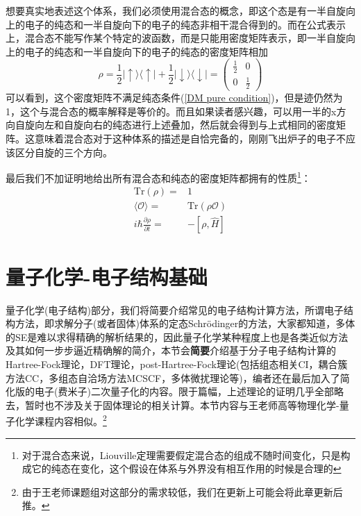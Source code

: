 \documentclass[12pt,a4paper,openany,twoside]{book}
\numberwithin{equation}{section}
\begin{document}
  想要真实地表述这个体系，我们必须使用混合态的概念，即这个态是有一半自旋向上的电子的纯态和一半自旋向下的电子的纯态非相干混合得到的。而在公式表示上，混合态不能写作某个特定的波函数，而是只能用密度矩阵表示，即一半自旋向上的电子的纯态和一半自旋向下的电子的纯态的密度矩阵相加
  \begin{equation}
    \rho = \frac{1}{2} | \uparrow \rangle \langle \uparrow |+\frac{1}{2} | \downarrow \rangle \langle \downarrow |=\left(\begin{array}{ll} {\frac{1}{2}}&{0}\\{0}&{\frac{1}{2}} \end{array}\right)
  \end{equation}
  可以看到，这个密度矩阵不满足纯态条件(\ref{DM pure condition})，但是迹仍然为1，这个与混合态的概率解释是等价的。而且如果读者感兴趣，可以用一半的x方向自旋向左和自旋向右的纯态进行上述叠加，然后就会得到与上式相同的密度矩阵。这意味着混合态对于这种体系的描述是自恰完备的，刚刚飞出炉子的电子不应该区分自旋的三个方向。
  
  最后我们不加证明地给出所有混合态和纯态的密度矩阵都拥有的性质\footnote{对于混合态来说，Liouville定理需要假定混合态的组成不随时间变化，只是构成它的纯态在变化，这个假设在体系与外界没有相互作用的时候是合理的}：\\
  \begin{align*}
    \text{Tr}(\rho)=&1\\
    \langle\mathcal{O}\rangle=&\text{Tr}(\rho \mathcal{O})\\
    i \hbar \frac{\partial \rho}{\partial t}=&-[\rho,\hat{H}]
  \end{align*}
  

  \chapter{量子化学-电子结构基础}
    量子化学(电子结构)部分，我们将简要介绍常见的电子结构计算方法，所谓电子结构方法，即求解分子(或者固体)体系的定态Schr\"odinger的方法，大家都知道，多体的SE是难以求得精确的解析结果的，因此量子化学某种程度上也是各类近似方法及其如何一步步逼近精确解的简介，本节会\textbf{简要}介绍基于分子电子结构计算的Hartree-Fock理论，DFT理论，post-Hartree-Fock理论(包括组态相关CI，耦合簇方法CC，多组态自洽场方法MCSCF，多体微扰理论等)，编者还在最后加入了简化版的电子(费米子)二次量子化的内容。限于篇幅，上述理论的证明几乎全部略去，暂时也不涉及关于固体理论的相关计算。本节内容与王老师高等物理化学-量子化学课程内容相似。\footnote{由于王老师课题组对这部分的需求较低，我们在更新上可能会将此章更新后推。}
    
\end{document}
